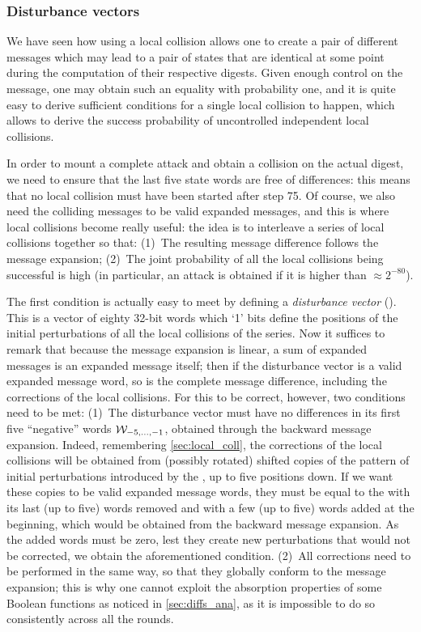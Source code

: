 \subsubsection{Disturbance vectors}
\label{sec:dv_sha0}

We have seen how using a local collision allows one to create a pair of different messages which may lead to a pair of \sha states that are identical at some point during the
computation of their respective digests. Given enough control on the message, one may obtain such an equality with probability one, and it is quite easy to derive sufficient conditions
for a single local collision to happen, which allows to derive the success probability of uncontrolled independent local collisions. 

In order to mount a complete attack and obtain a collision on the actual digest, we need to ensure that the last five state words are free of differences: this means that no local collision
must have been started after step 75. Of course, we also need the colliding messages to be valid expanded messages, and this is where local collisions become really useful: the idea is to
interleave a series of local collisions together so that: (1)~The resulting message difference follows the message expansion; (2)~The joint probability of all the local collisions being successful
is high (in particular, an attack is obtained if it is higher than $\approx 2^{-80}$).

The first condition is actually easy to meet by defining a \emph{disturbance vector} (\dv). This is a vector of eighty 32-bit words which `1' bits define the positions of the initial perturbations of all the
local collisions of the series. Now it suffices to remark that because the message expansion is linear, a sum of expanded messages is an expanded message itself;
then if the disturbance vector is a valid expanded message word, so is the complete message difference, including the corrections of the local
collisions. For this to be correct, however, two conditions need to be met: (1)~The disturbance vector must have no differences in its first five ``negative'' words $\mathcal{W}_{-5,\ldots,-1}$, obtained through
the backward message expansion. Indeed, remembering \autoref{sec:local_coll}, the corrections of the local collisions will be obtained from (possibly rotated) shifted copies of the pattern of initial perturbations introduced by the \dv,
up to five positions down. If we want these copies to be valid expanded message words, they must be equal to the \dv with its last (up to five) words removed and with a few (up to five) words
added at the beginning, which would be obtained from the backward message expansion. As the added words must be zero, lest they create new perturbations that would not be corrected, we obtain the aforementioned
condition. (2)~All corrections need to be performed in the same way, so that they globally conform to the message expansion; this is why one cannot exploit the absorption properties of some Boolean functions as noticed in \autoref{sec:diffs_ana},
as it is impossible to do so consistently across all the rounds.

